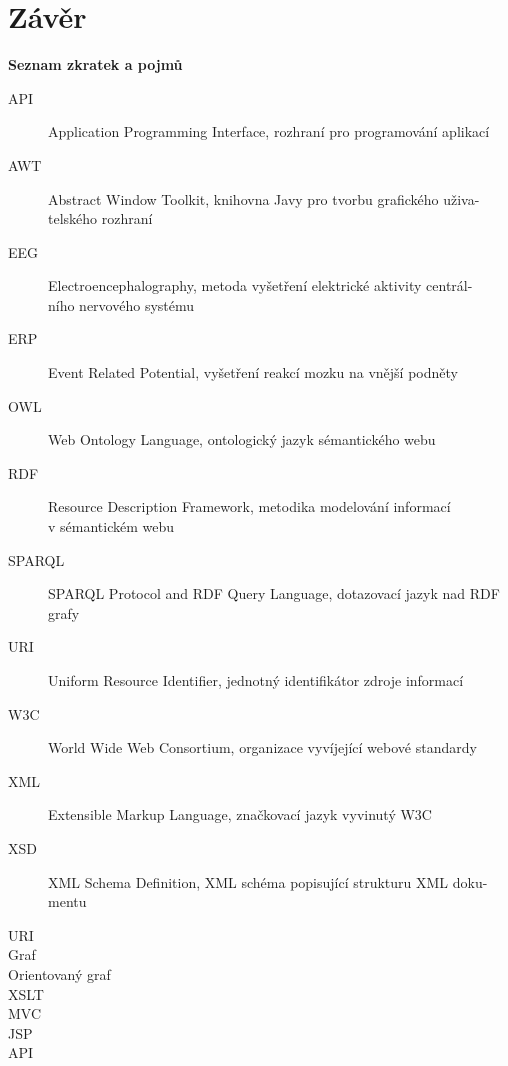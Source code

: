 \documentclass{projekt}
\begin{document}
\chapter{Závěr}


\newpage
\thispagestyle{plain}
\noindent
{\bf \LARGE Seznam zkratek a pojmů}\\

\noindent
\begin{description}
\item[API] Application Programming Interface, rozhraní pro programování aplikací
\item[AWT] Abstract Window Toolkit, knihovna Javy pro tvorbu grafického uživa-\\telského rozhraní
\item[EEG] Electroencephalography, metoda vyšetření elektrické aktivity centrál-\\ního nervového
systému
\item[ERP] Event Related Potential, vyšetření reakcí mozku na vnější podněty
\item[OWL] Web Ontology Language, ontologický jazyk sémantického webu
\item[RDF] Resource Description Framework, metodika modelování informací \\v sémantickém webu
\item[SPARQL] SPARQL Protocol and RDF Query Language, dotazovací jazyk nad RDF grafy
\item[URI] Uniform Resource Identifier, jednotný identifikátor zdroje informací
\item[W3C] World Wide Web Consortium, organizace vyvíjející webové standardy
\item[XML] Extensible Markup Language, značkovací jazyk vyvinutý W3C
\item[XSD] XML Schema Definition, XML schéma popisující strukturu XML doku-\\mentu

\item[URI]
\item[Graf]
\item[Orientovaný graf]
\item[XSLT]
\item[MVC]
\item[JSP]
\item[API]


\end{description}


\listoffigures
\end{document}
